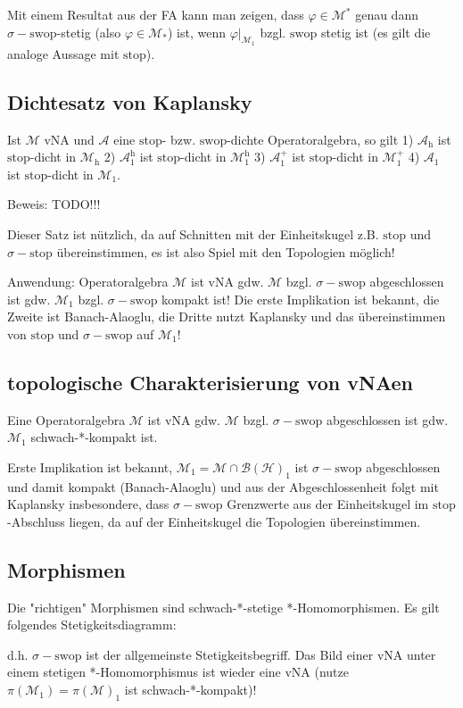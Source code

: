 \documentclass[11pt,a4paper]{scrartcl}
\newcommand{\Hc}{\mathcal{H}}
\newcommand{\A}{\mathcal{A}}
\newcommand{\B}{\mathcal{B}}
\newcommand{\M}{\mathcal{M}}
\theoremstyle{plain}
\theoremstyle{definition}
\theoremstyle{remark}
\begin{document}
Mit einem Resultat aus der FA kann man zeigen, dass $\varphi \in \M^*$ genau dann $\sigma-\mathrm{swop}$-stetig (also $\varphi\in \M_*$) ist, wenn $\varphi|_{\M_1}$ bzgl. $\mathrm{swop}$ stetig ist (es gilt die analoge Aussage mit $\mathrm{stop}$).

\subsection{Dichtesatz von Kaplansky}

Ist $\M$ vNA und $\A$ eine $\mathrm{stop}$- bzw. $\mathrm{swop}$-dichte Operatoralgebra, so gilt 1) $\A_\mathrm{h}$ ist $\mathrm{stop}$-dicht in $\M_\mathrm{h}$ 2) $\A_1^\mathrm{h}$ ist $\mathrm{stop}$-dicht in $\M_1^\mathrm{h}$ 3) $\A_1^+$ ist $\mathrm{stop}$-dicht in $\M_1^+$ 4) $\A_1$ ist $\mathrm{stop}$-dicht in $\M_1$.

Beweis: TODO!!!

Dieser Satz ist nützlich, da auf Schnitten mit der Einheitskugel z.B. $\mathrm{stop}$ und $\sigma-\mathrm{stop}$ übereinstimmen, es ist also Spiel mit den Topologien möglich!

Anwendung: Operatoralgebra $\M$ ist vNA gdw. $\M$ bzgl. $\sigma-\mathrm{swop}$ abgeschlossen ist gdw. $\M_1$ bzgl. $\sigma-\mathrm{swop}$ kompakt ist! Die erste Implikation ist bekannt, die Zweite ist Banach-Alaoglu, die Dritte nutzt Kaplansky und das übereinstimmen von $\mathrm{stop}$ und $\sigma-\mathrm{swop}$ auf $\M_1$!

\subsection{topologische Charakterisierung von vNAen}

Eine Operatoralgebra $\M$ ist vNA gdw. $\M$ bzgl. $\sigma-\mathrm{swop}$ abgeschlossen ist gdw. $\M_1$ schwach-*-kompakt ist.

Erste Implikation ist bekannt, $\M_1=\M\cap \B(\Hc)_1$ ist $\sigma-\mathrm{swop}$ abgeschlossen und damit kompakt (Banach-Alaoglu) und aus der Abgeschlossenheit folgt mit Kaplansky insbesondere, dass $\sigma-\mathrm{swop}$ Grenzwerte aus der Einheitskugel im $\mathrm{stop}$-Abschluss liegen, da auf der Einheitskugel die Topologien übereinstimmen.

\subsection{Morphismen}

Die "richtigen" Morphismen sind schwach-*-stetige *-Homomorphismen. Es gilt folgendes Stetigkeitsdiagramm:

\begin{center}\end{center}

d.h. $\sigma-\mathrm{swop}$ ist der allgemeinste Stetigkeitsbegriff. Das Bild einer vNA unter einem stetigen *-Homomorphismus ist wieder eine vNA (nutze $\pi(\M_1)=\pi(\M)_1$ ist schwach-*-kompakt)!
\end{document}
